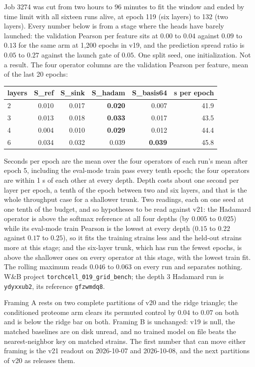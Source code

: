  Job 3274 was cut
from two hours to 96 minutes to fit the window and ended by time limit with all sixteen runs
alive, at epoch 119 (six layers) to 132 (two layers). Every number below is from a stage
where the heads have barely launched: the validation Pearson per feature sits at $0.00$ to
$0.04$ against $0.09$ to $0.13$ for the same arm at 1{,}200 epochs in v19, and the
prediction spread ratio is $0.05$ to $0.27$ against the launch gate of $0.05$. One split
seed, one initialization. Not a result. The four operator columns are the validation
Pearson per feature, mean of the last 20 epochs:

\begin{center}\footnotesize
\begin{tabular}{@{}lrrrrr@{}}
\toprule
layers & S\_ref & S\_sink & S\_hadam & S\_basis64 & s per epoch \\
\midrule
2 & 0.010 & 0.017 & \textbf{0.020} & 0.007 & 41.9 \\
3 & 0.013 & 0.018 & \textbf{0.033} & 0.017 & 43.5 \\
4 & 0.004 & 0.010 & \textbf{0.029} & 0.012 & 44.4 \\
6 & 0.034 & 0.032 & 0.039 & \textbf{0.039} & 45.8 \\
\bottomrule
\end{tabular}
\end{center}

Seconds per epoch are the mean over the four operators of each run's mean after epoch 5,
including the eval-mode train pass every tenth epoch; the four operators are within 1 s of
each other at every depth. Depth costs about one second per layer per epoch, a tenth of the
epoch between two and six layers, and that is the whole throughput case for a shallower
trunk. Two readings, each on one seed at one tenth of the budget, and so hypotheses to be
read against v21: the Hadamard operator is above the softmax reference at all four depths
(by $0.005$ to $0.025$) while its eval-mode train Pearson is the lowest at every depth
($0.15$ to $0.22$ against $0.17$ to $0.25$), so it fits the training strains less and the
held-out strains more at this stage; and the six-layer trunk, which has run the fewest
epochs, is above the shallower ones on every operator at this stage, with the lowest train
fit. The rolling maximum reads $0.046$ to $0.063$ on every run and separates nothing. W\&B
project \texttt{torchcell\_019\_grid\_bench}; the depth 3 Hadamard run is
\texttt{ydyxxub2}, its reference \texttt{gfzwmdq8}.

 Framing A rests on two complete partitions of
v20 and the ridge triangle; the conditioned proteome arm clears its permuted control by
$0.04$ to $0.07$ on both and is below the ridge bar on both. Framing B is unchanged: v19 is
null, the matched baselines are on disk unread, and no trained model on file beats the
nearest-neighbor key on matched strains. The first number that can move either framing is
the v21 readout on 2026-10-07 and 2026-10-08, and the next partitions of v20 as 
releases them.
